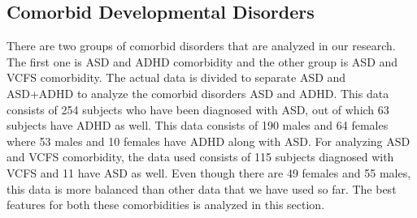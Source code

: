 \subsection{Comorbid Developmental Disorders}
There are two groups of comorbid disorders that are analyzed in our research. The first one is ASD and ADHD comorbidity and the other group is ASD and VCFS comorbidity. The actual data is divided to separate ASD and ASD+ADHD to analyze the comorbid disorders ASD and ADHD. This data consists of 254 subjects who have been diagnosed with ASD, out of which 63 subjects have ADHD as well. This data consists of 190 males and 64 females where 53 males  and 10 females have ADHD along with ASD. For analyzing ASD and VCFS comorbidity, the data used consists of 115 subjects diagnosed with VCFS and 11 have ASD as well. Even though there are 49 females and 55 males, this data is more balanced than other data that we have used so far. The best features for both these comorbidities is analyzed in this section. 
